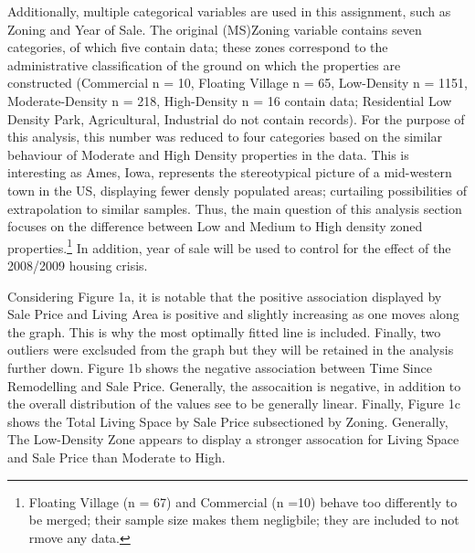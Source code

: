 \documentclass[a4paper]{article}
\begin{document}
Additionally, multiple categorical variables are used in this assignment, such as Zoning and Year of Sale. The original (MS)Zoning variable contains seven categories, of which five contain data; these zones correspond to the administrative classification of the ground on which the properties are constructed (Commercial n = 10, Floating Village n = 65, Low-Density n = 1151, Moderate-Density n = 218, High-Density n = 16 contain data; Residential Low Density Park, Agricultural, Industrial do not contain records). For the purpose of this analysis, this number was reduced to four categories based on the similar behaviour of Moderate and High Density properties in  the data. This is interesting as Ames, Iowa, represents the stereotypical picture of a mid-western town in the US, displaying fewer densly populated areas; curtailing possibilities of extrapolation to similar samples. Thus, the main question of this analysis section focuses on the difference between Low and Medium to High density zoned properties.\footnote{Floating Village (n = 67) and Commercial (n =10) behave too differently to be merged; their sample size makes them negligbile; they are included to not rmove any data.} In addition, year of sale will be used to control for the effect of the 2008/2009 housing crisis.




Considering Figure 1a, it is notable that the positive association displayed by Sale Price and Living Area is positive and slightly increasing as one moves along the graph. This is why the most optimally fitted line is included. Finally, two outliers were exclsuded from the graph but they will be retained in the analysis further down. Figure 1b shows the negative association between Time Since Remodelling and Sale Price. Generally, the assocaition is negative, in addition to the overall distribution of the values see to be generally linear. Finally, Figure 1c shows the Total Living Space by Sale Price subsectioned by Zoning. Generally, The Low-Density Zone appears to display a stronger assocation for Living Space and Sale Price than Moderate to High. 
\end{document}
